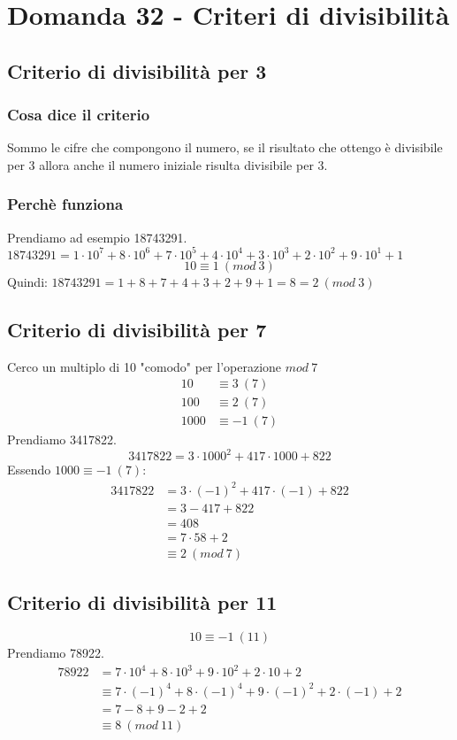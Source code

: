 \documentclass[]{article}
\begin{document}
\section{Domanda 32 - Criteri di divisibilità}
\subsection{Criterio di divisibilità per 3}
\subsubsection*{Cosa dice il criterio}
Sommo le cifre che compongono il numero, se il risultato che ottengo è divisibile per 3 allora anche il numero iniziale risulta divisibile per 3.
\subsubsection*{Perchè funziona}
Prendiamo ad esempio 18743291.\\
$18743291 = 1 \cdot 10^7 + 8 \cdot 10^6 + 7 \cdot 10^5 + 4 \cdot 10^4 + 3 \cdot 10^3 + 2 \cdot 10^2 + 9 \cdot 10^1 + 1$
$$10 \equiv 1 \ (mod\ 3)$$
Quindi:
$18743291 = 1+8+7+4+3+2+9+1 = 8 = 2 \ (mod\ 3)$
\subsection{Criterio di divisibilità per 7}
Cerco un multiplo di 10 "comodo" per l'operazione $mod\ 7$
\begin{align*}
10 &\equiv 3\ (7)\\
100 &\equiv 2\ (7) \\
1000 &\equiv -1\ (7)
\end{align*}
Prendiamo 3417822.\\
$$3417822 = 3 \cdot 1000^2 + 417 \cdot 1000 + 822$$
Essendo $1000 \equiv -1\ (7)$: 
\begin{align*}
3417822 &= 3 \cdot (-1)^2 + 417 \cdot (-1) + 822\\
&= 3 -417 +822\\ &= 408 \\ &= 7\cdot 58 + 2\\ &\equiv 2\ (mod\ 7)
\end{align*}
\subsection{Criterio di divisibilità per 11}
$$10\equiv -1 \ (11)$$
Prendiamo 78922. \\
\begin{align*}
78922 &= 7\cdot 10^4+ 8\cdot 10^3 + 9 \cdot 10^2 + 2 \cdot 10 + 2\\
&\equiv 7 \cdot (-1)^4 + 8 \cdot (-1)^4 + 9 \cdot (-1)^2 + 2 \cdot (-1) + 2\\
&=7-8+9-2+2\\
&\equiv 8\ (mod\ 11)
\end{align*}
\end{document}
